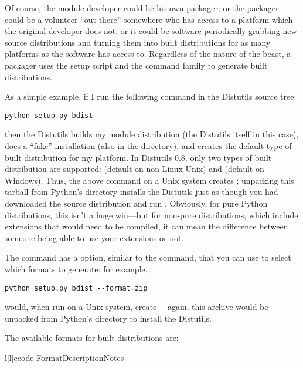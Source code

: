 \documentclass{howto}
\begin{document}
Of course, the module developer could be his own packager; or the
packager could be a volunteer ``out there'' somewhere who has access to
a platform which the original developer does not; or it could be
software periodically grabbing new source distributions and turning them
into built distributions for as many platforms as the software has
access to.  Regardless of the nature of the beast, a packager uses the
setup script and the  command family to generate built
distributions.

As a simple example, if I run the following command in the Distutils
source tree:
\begin{verbatim}
python setup.py bdist
\end{verbatim}
then the Distutils builds my module distribution (the Distutils itself
in this case), does a ``fake'' installation (also in the 
directory), and creates the default type of built distribution for my
platform.  In Distutils 0.8, only two types of built distribution are
supported:  (default on non-Linux Unix) and 
(default on Windows).  Thus, the above command on a Unix system creates
; unpacking this tarball from
Python's  directory installs the Distutils just as
though you had downloaded the source distribution and run .  Obviously, for pure Python distributions, this
isn't a huge win---but for non-pure distributions, which include
extensions that would need to be compiled, it can mean the difference
between someone being able to use your extensions or not.


The  command has a  option,
similar to the  command, that you can use to select which
formats to generate: for example,
\begin{verbatim}
python setup.py bdist --format=zip
\end{verbatim}
would, when run on a Unix system, create
---again, this archive would be
unpacked from Python's  directory to install the
Distutils.

The available formats for built distributions are:
\begin{tableiii}{l|l|c}{code}%
  {Format}{Description}{Notes}
\end{tableiii}
\end{document}
